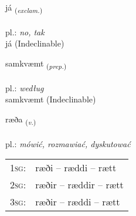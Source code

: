 \documentclass[frontgrid, backgrid]{flacards}\usepackage[]{graphicx}\usepackage[]{xcolor}
\begin{document}
{já \small{\textsubscript{(\textit{exclam.})}} \\[1ex]
\textphonetic{[jauː]} \\
pl.: \emph{no, tak} \\  [2ex]
já (Indeclinable)}


\renewcommand{\flhead}{\vskip5pt \fboxsep=0pt {\small\bfseries\footnotesize Forsetning | Preposition}}
\renewcommand{\fcfoot}{\vskip5pt \fboxsep=0pt \hspace{2pt}{\small\bfseries\footnotesize 1K}}

\renewcommand{\blhead}{\vskip5pt {\small\bfseries\footnotesize Forsetning | Preposition }}
\renewcommand{\bcfoot}{\vskip5pt \hspace{2pt}{\small\bfseries\footnotesize 1K}}


{samkvæmt \small{\textsubscript{(\textit{prep.})}} \\[1ex]
\textphonetic{[samkʰvaim̥t]} \\
pl.: \emph{według} \\  [2ex]
samkvæmt (Indeclinable)}

\renewcommand{\flhead}{\vskip5pt \fboxsep=0pt {\small\bfseries\footnotesize Sagnorð | Verb}}
\renewcommand{\fcfoot}{\vskip5pt \fboxsep=0pt \hspace{2pt}{\small\bfseries\footnotesize 1K}}

\renewcommand{\blhead}{\vskip5pt {\small\bfseries\footnotesize Sagnorð | Verb }}
\renewcommand{\bcfoot}{\vskip5pt \hspace{2pt}{\small\bfseries\footnotesize 1K}}


{ræða \small{\textsubscript{(\textit{v.})}} \\[1ex] %
\textphonetic{[raiːða]} \\
pl.: \emph{mówić, rozmawiać, dyskutować} \\  [2ex]
\renewcommand*{\arraystretch}{0.8}
\begin{tabular}{p{1cm}l}
\textsc{1sg}: & ræði -- ræddi -- rætt \\ 
\textsc{2sg}: & ræðir -- ræddir -- rætt \\ 
\textsc{3sg}: & ræðir -- ræddi -- rætt \\ 
\end{tabular}
}
\end{document}
